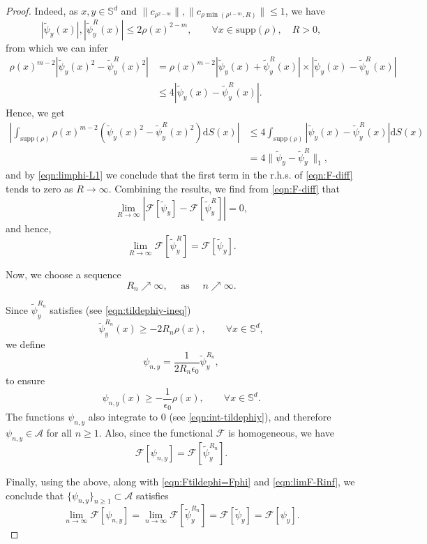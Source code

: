 \documentclass[11pt]{amsart}
\newcommand{\bbs}{\mathbb S}
\newcommand{\calF}{\mathcal{F}}
\newcommand{\dx}{\mathrm{d}S (x)}
\newcommand{\supp}{\mathrm{supp}(\rho)}
\newcommand{\dm}{d} %
\begin{document}
\begin{proof}
Indeed, as $x, y\in\bbs^\dm$ and $\|c_{\rho^{2-m}}\|,\|c_{\rho\min(\rho^{1-m},R)}\|\leq1$, we have
\[
|\tilde{\psi}_y(x)|,|\tilde{\psi}_y^R(x)|\leq 2\rho(x)^{2-m}, \qquad\forall x\in\supp,\quad R>0,
\]
from which we can infer
\begin{align*}
\rho(x)^{m-2}\left|\tilde{\psi}_y(x)^2-\tilde{\psi}_y^R(x)^2\right|&=\rho(x)^{m-2}\left|\tilde{\psi}_y(x)+\tilde{\psi}_y^R(x)\right|\times\left|\tilde{\psi}_y(x)-\tilde{\psi}_y^R(x)\right|\\
&\leq4\left|\tilde{\psi}_y(x)-\tilde{\psi}_y^R(x)\right|.
\end{align*}
Hence, we get
\begin{align*}
\left|
\int_{\supp}\rho(x)^{m-2}(\tilde{\psi}_y(x)^2-\tilde{\psi}_y^R(x)^2)\dx\right|& \leq 4\int_{\supp}|\tilde{\psi}_y(x)-\tilde{\psi}_y^R(x)|\dx \\
&=4\|\tilde{\psi}_y-\tilde{\psi}_y^R\|_1,
\end{align*}
and by \eqref{eqn:limphi-L1} we conclude that the first term in the r.h.s. of \eqref{eqn:F-diff} tends to zero as $R\to\infty$. Combining the results, we find from \eqref{eqn:F-diff} that
\[
\lim_{R\to\infty}\left|\mathcal{F}[\tilde{\psi}_y]-\mathcal{F}[\tilde{\psi}_y^R]\right|=0,
\]
and hence,
\begin{equation}
\label{eqn:limF-Rinf}
\lim_{R\to\infty}\mathcal{F}[\tilde{\psi}_y^R]=\mathcal{F}[\tilde{\psi}_y].
\end{equation}

Now, we choose a sequence 
\[
R_n\nearrow\infty,\quad\text{ as }\quad n\nearrow\infty.
\]

Since $\tilde{\psi}_y^{R_n}$ satisfies (see \eqref{eqn:tildephiy-ineq})
\[
\tilde{\psi}_y^{R_n}(x)\geq-2R_n\rho(x),\qquad\forall x\in\bbs^\dm,
\]
we define
\[
\psi_{n, y}=\frac{1}{2R_n\epsilon_0}\tilde{\psi}_y^{R_n},
\]
to ensure
\[
\psi_{n, y}(x)\geq -\frac{1}{\epsilon_0}\rho(x), \qquad\forall x\in\bbs^\dm.
\]
The functions $\psi_{n,y}$ also integrate to $0$ (see \eqref{eqn:int-tildephiy}), and therefore $\psi_{n, y}\in\mathcal{A}$ for all $n \geq 1$. Also, since the functional $\calF$ is homogeneous, we have 
\[
\mathcal{F}[\psi_{n,y}]=\mathcal{F}[\tilde{\psi}_y^{R_n}].
\]

Finally, using the above, along with \eqref{eqn:Ftildephi=Fphi} and \eqref{eqn:limF-Rinf}, we conclude that $\{\psi_{n, y}\}_{n\geq1}\subset\mathcal{A}$ satisfies 
\[
\lim_{n\to\infty}\mathcal{F}[\psi_{n, y}]= \lim_{n\to\infty}\mathcal{F}[\tilde{\psi}_y^{R_n}] = \mathcal{F}[\tilde{\psi}_y]=\mathcal{F}[\psi_y].
\]
\end{proof}
\end{document}
